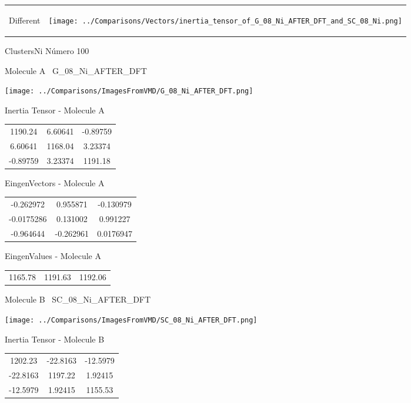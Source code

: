 \vtab[-5mm]
\begin{tabular}{*{2}{m{}}}
\begin{center}
\textcolor{NavyBlue}{\Large Different}
\end{center}
&
\begin{center}
\texttt{[image: ../Comparisons/Vectors/inertia\_tensor\_of\_G\_08\_Ni\_AFTER\_DFT\_and\_SC\_08\_Ni.png]}
\end{center}
\end{tabular}

 \newpage

\vtab[-3cm]
\begin{center}
{\large ClustersNi \tab Número 100}
\end{center}
\begin{multicols}{2}
\begin{center}

Molecule A \
G\_08\_Ni\_AFTER\_DFT

\texttt{[image: ../Comparisons/ImagesFromVMD/G\_08\_Ni\_AFTER\_DFT.png]}

Inertia Tensor - Molecule A \\
\begin{tabular}{|c c c|}
1190.24	 & 	6.60641	 & 	-0.89759	 \\
6.60641	 & 	1168.04	 & 	3.23374	 \\
-0.89759	 & 	3.23374	 & 	1191.18
\end{tabular}

\vtab
 EingenVectors - Molecule A     \\
\begin{tabular}{|c c c|}
-0.262972	 & 	0.955871	 & 	-0.130979	 \\
-0.0175286	 & 	0.131002	 & 	0.991227	 \\
-0.964644	 & 	-0.262961	 & 	0.0176947
\end{tabular}

\vtab
 EingenValues - Molecule A     \\
\begin{tabular}{|c c c|}
1165.78	 & 	1191.63	 & 	1192.06	 \\
\end{tabular}
\columnbreak

Molecule B \
SC\_08\_Ni\_AFTER\_DFT

\texttt{[image: ../Comparisons/ImagesFromVMD/SC\_08\_Ni\_AFTER\_DFT.png]}

Inertia Tensor - Molecule B \\
\begin{tabular}{|c c c|}
1202.23	 & 	-22.8163	 & 	-12.5979	 \\
-22.8163	 & 	1197.22	 & 	1.92415	 \\
-12.5979	 & 	1.92415	 & 	1155.53
\end{tabular}


\end{center}
\end{multicols}
